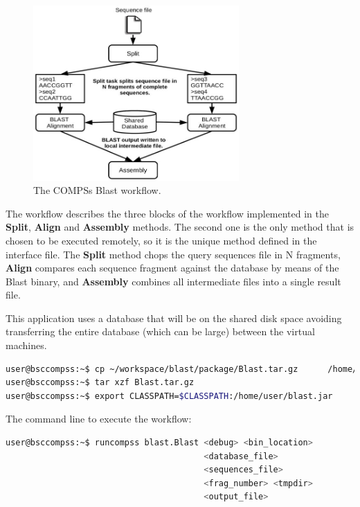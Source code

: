 \begin{figure}[ht!]
  \centering
    \includegraphics[width=0.7\textwidth]{./Sections/4_Sample_Apps/Figures/blast_workflow.jpeg}
    \caption{The COMPSs Blast workflow. \label{fig:BLAST_workflow}}
\end{figure}

The workflow describes the three blocks of the workflow implemented in the {\bf Split}, {\bf Align} and 
{\bf Assembly} methods. The second one is the only method that is chosen to be executed remotely, so it 
is the unique method defined in the interface file. The {\bf Split} method chops the query sequences file 
in N fragments, {\bf Align} compares each sequence fragment against the database by means of the Blast 
binary, and {\bf Assembly} combines all intermediate files into a single result file.

This application uses a database that will be on the shared disk space avoiding transferring the entire 
database (which can be large) between the virtual machines.

\begin{lstlisting}[language=bash]
user@bsccompss:~$ cp ~/workspace/blast/package/Blast.tar.gz      /home/user/
user@bsccompss:~$ tar xzf Blast.tar.gz
user@bsccompss:~$ export CLASSPATH=$CLASSPATH:/home/user/blast.jar
\end{lstlisting}

The command line to execute the workflow:

\begin{lstlisting}[language=bash]
user@bsccompss:~$ runcompss blast.Blast <debug> <bin_location>
                                        <database_file> 
                                        <sequences_file>
                                        <frag_number> <tmpdir>
                                        <output_file>
\end{lstlisting}


